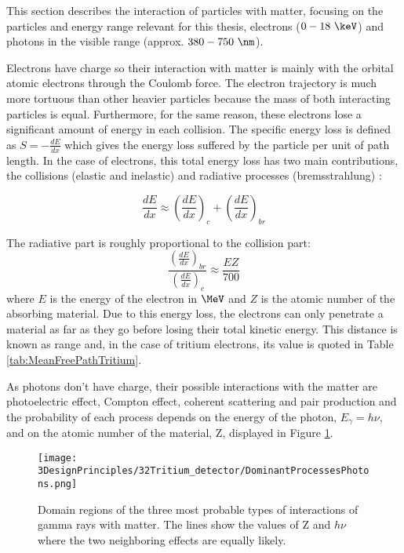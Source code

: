 This section describes the interaction of particles with matter, focusing on the particles and energy range relevant for this thesis, electrons ($0-18~\keV$) and photons in the visible range (approx. $380-750~\nm$).

Electrons have charge so their interaction with matter is mainly with the orbital atomic  electrons through the Coulomb force. The electron trajectory is much more tortuous than other heavier particles because the mass of both interacting particles is equal. Furthermore, for the same reason, these electrons lose a significant amount of energy in each collision. The specific energy loss is defined as $S=-\frac{dE}{dx}$ which gives the energy loss suffered by the particle per unit of path length. In the case of electrons, this total energy loss has two main contributions, the collisions (elastic and inelastic) and radiative processes (bremsstrahlung) \cite{Knoll, Leo}:

\begin{equation}
\frac{dE}{dx} \approx \left(\frac{dE}{dx}\right)_{c} + \left(\frac{dE}{dx}\right)_{br} 
\label{eq:ElectronInteraction}
\end{equation}

The radiative part is roughly proportional to the collision part:
\begin{equation}
\frac{\displaystyle{\left(\frac{dE}{dx}\right)_{br}}}{\displaystyle{\left(\frac{dE}{dx}\right)_{c}}} \approx \frac{EZ}{700}
\label{eq:ProportionalMagnituds}
\end{equation}
where $E$ is the energy of the electron in $\MeV$ and $Z$ is the atomic number of the absorbing material. Due to this energy loss, the electrons can only penetrate a material as far as they go before losing their total kinetic energy. This distance is known as range and, in the case of tritium electrons, its value is quoted in Table \ref{tab:MeanFreePathTritium}.

As photons don't have charge, their possible interactions with the matter are photoelectric effect, Compton effect, coherent scattering and pair production and the probability of each process depends on the energy of the photon, $E_\gamma = h\nu$, and on the atomic number of the material, Z, displayed in Figure \ref{fig:ProcessesPhotons}.

\begin{figure}[htbp]
\centering
\texttt{[image: 3DesignPrinciples/32Tritium\_detector/DominantProcessesPhotons.png]}
\caption{Domain regions of the three most probable types of interactions of gamma rays with matter. The lines show the values of Z and $h\nu$ where the two neighboring effects are equally likely.\label{fig:ProcessesPhotons}~\cite{Knoll, Leo}}
\end{figure}

